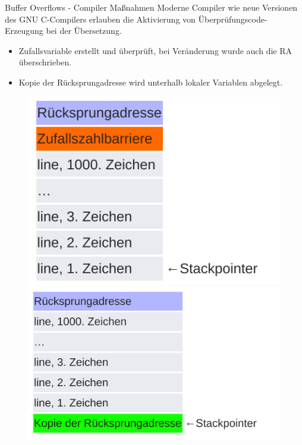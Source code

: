\documentclass[10pt]{beamer}
\begin{document}
\begin{frame}[fragile]{Buffer Overflows - Compiler Ma{\ss}nahmen}
  Moderne Compiler wie neue Versionen des GNU C-Compilers erlauben die Aktivierung von \"Uberpr\"ufungscode-Erzeugung bei der \"Ubersetzung.

  \begin{itemize}
    \item Zufallsvariable erstellt und \"uberpr\"uft, bei Ver\"anderung wurde auch die RA \"uberschrieben.
    \item Kopie der R\"ucksprungadresse wird unterhalb lokaler Variablen abgelegt.
  \end{itemize}

  \begin{figure}%
   \centering
   {\includegraphics[scale=0.10]{stackgcc_1}}%
   \quad
   {\includegraphics[scale=0.10]{stackgcc_2}}%
  \end{figure}
\end{frame}
\end{document}
